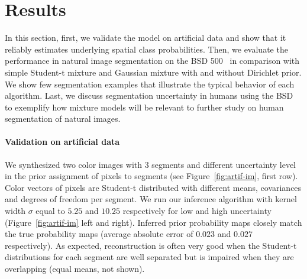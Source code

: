 \documentclass[a4paper,12pt]{article}
\begin{document}
\section{Results}
\label{sec:results}

In this section, first, we validate the model on artificial data and show that it reliably estimates underlying spatial class probabilities. Then, we evaluate the performance in natural image segmentation on the BSD 500~\cite{arbelaez2011contour} in comparison with simple Student-t mixture and Gaussian mixture with and without Dirichlet prior. We show few segmentation examples that illustrate the typical behavior of each algorithm. Last, we discuss segmentation uncertainty in humans using the BSD to exemplify how mixture models will be relevant to further study on human segmentation of natural images.

\paragraph{Validation on artificial data}
We synthesized two color images with 3 segments and different uncertainty level in the prior assignment of pixels to segments (see Figure~\ref{fig:artif-im}, first row). Color vectors of pixels are Student-t distributed with different means, covariances and degrees of freedom per segment. We run our inference algorithm with kernel width $\sigma$ equal to $5.25$ and $10.25$ respectively for low and high uncertainty (Figure~\ref{fig:artif-im} left and right). Inferred prior probability maps closely match the true probability maps (average absolute error of $0.023$ and $0.027$ respectively). As expected, reconstruction is often very good when the Student-t distributions for each segment are well separated but is impaired when they are overlapping (\eg equal means, not shown).

\end{document}
